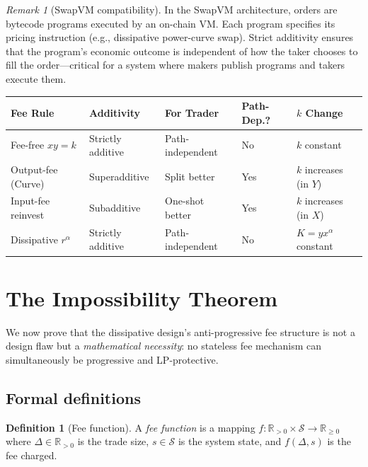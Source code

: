 \documentclass[11pt]{article}
\theoremstyle{definition}
\newtheorem{definition}[theorem]{Definition}
\theoremstyle{remark}
\newtheorem{remark}[theorem]{Remark}
\newcommand{\R}{\mathbb{R}}
\newcommand{\Rp}{\R_{>0}}
\begin{document}
\begin{remark}[SwapVM compatibility]
In the SwapVM architecture, orders are bytecode programs executed by an on-chain VM.
Each program specifies its pricing instruction (e.g., dissipative power-curve swap).
Strict additivity ensures that the program's economic outcome is independent of how the taker chooses to fill the order---critical for a system where makers publish programs and takers execute them.
\end{remark}

\begin{center}
\begin{tabular}{@{}lllll@{}}
\toprule
\textbf{Fee Rule} & \textbf{Additivity} & \textbf{For Trader} & \textbf{Path-Dep.?} & \textbf{$k$ Change} \\
\midrule
Fee-free $xy=k$ & Strictly additive & Path-independent & No & $k$ constant \\
Output-fee (Curve) & Superadditive & Split better & Yes & $k$ increases (in $Y$) \\
Input-fee reinvest & Subadditive & One-shot better & Yes & $k$ increases (in $X$) \\
Dissipative $r^\alpha$ & Strictly additive & Path-independent & No & $K=y x^\alpha$ constant \\
\bottomrule
\end{tabular}
\end{center}


\section{The Impossibility Theorem}\label{sec:impossibility}

We now prove that the dissipative design's anti-progressive fee structure is not a design flaw but a \emph{mathematical necessity}: no stateless fee mechanism can simultaneously be progressive and LP-protective.

\subsection{Formal definitions}

\begin{definition}[Fee function]
A \emph{fee function} is a mapping $f:\Rp\times\mathcal{S}\to\R_{\ge 0}$ where $\Delta\in\Rp$ is the trade size, $s\in\mathcal{S}$ is the system state, and $f(\Delta,s)$ is the fee charged.
\end{definition}
\end{document}

